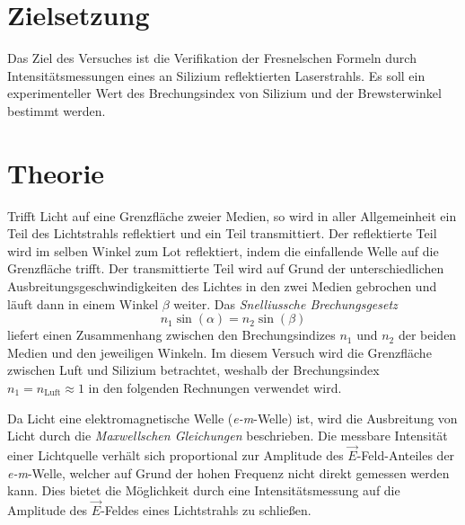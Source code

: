 \section{Zielsetzung}
\label{sec:Ziel}
Das Ziel des Versuches ist die Verifikation der Fresnelschen Formeln durch Intensitätsmessungen eines an Silizium reflektierten Laserstrahls. Es soll ein experimenteller
Wert des Brechungsindex von Silizium und der Brewsterwinkel bestimmt werden.

\section{Theorie}
\label{sec:Theorie}
Trifft Licht auf eine Grenzfläche zweier Medien, so wird in aller Allgemeinheit ein Teil des Lichtstrahls reflektiert und ein Teil transmittiert. Der reflektierte Teil
wird im selben Winkel zum Lot reflektiert, indem die einfallende Welle auf die Grenzfläche trifft. Der transmittierte Teil wird auf Grund der unterschiedlichen 
Ausbreitungsgeschwindigkeiten des Lichtes in den zwei Medien gebrochen und läuft dann in einem Winkel $\beta$ weiter. Das \textit{Snelliussche Brechungsgesetz}
\begin{equation}
    \label{eqn:Snellius}
    n_{1} \sin(\alpha)=n_{2} \sin(\beta)
\end{equation}
liefert einen Zusammenhang zwischen den Brechungsindizes $n_1$ und $n_2$ der beiden Medien und den jeweiligen Winkeln.
Im diesem Versuch wird die Grenzfläche zwischen Luft und Silizium betrachtet, weshalb der Brechungsindex $n_1 = n_\text{Luft} \approx 1$ in den folgenden Rechnungen
verwendet wird.

Da Licht eine elektromagnetische Welle (\textit{e-m}-Welle) ist, wird die Ausbreitung von Licht durch die \textit{Maxwellschen Gleichungen} beschrieben. Die messbare Intensität 
einer Lichtquelle verhält sich proportional zur Amplitude des $\vec{E}$-Feld-Anteiles der \textit{e-m}-Welle, welcher auf Grund der hohen Frequenz nicht direkt gemessen werden 
kann. Dies bietet die Möglichkeit durch eine Intensitätsmessung auf die Amplitude des $\vec{E}$-Feldes eines Lichtstrahls zu schließen.

